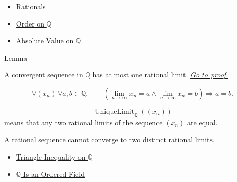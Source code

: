 \begin{dependencies}
\begin{itemize}
  \item \hyperref[def:rationals]{Rationals}
  \item \hyperref[def:order-on-q]{Order on $\mathbb{Q}$}
  \item \hyperref[def:absolute-value-on-q]{Absolute Value on $\mathbb{Q}$}
\end{itemize}
\end{dependencies}

\begin{lemmabox}{Lemma}
\begin{lemma}
\label{lem:rational-limit-unique}
A convergent sequence in $\mathbb{Q}$ has at most one rational limit.
\hyperref[prf:rational-limit-unique]{\textit{Go to proof.}}
\end{lemma}
\end{lemmabox}

\begin{remark*}
\[
\forall (x_n)\,\forall a,b\in\mathbb{Q},\qquad
\left(\lim_{n\to\infty}x_n=a\land \lim_{n\to\infty}x_n=b\right)
\Longrightarrow a=b.
\]
\end{remark*}

\begin{remark*}
\[
\operatorname{UniqueLimit}_{\mathbb{Q}}((x_n))
\]
means that any two rational limits of the sequence $(x_n)$ are equal.
\end{remark*}

\begin{remark*}[Interpretation]
A rational sequence cannot converge to two distinct rational limits.
\end{remark*}

\begin{dependencies}
\begin{itemize}
  \item \hyperref[thm:triangle-inequality-on-q]{Triangle Inequality on $\mathbb{Q}$}
  \item \hyperref[thm:q-is-an-ordered-field]{$\mathbb{Q}$ Is an Ordered Field}
\end{itemize}
\end{dependencies}
